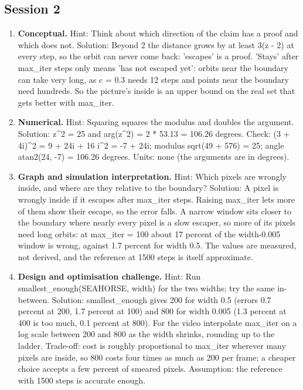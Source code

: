 \documentclass[11pt,a4paper]{article}
\begin{document}
\subsection*{Session 2}
\begin{enumerate}[nosep]
\item \textbf{Conceptual.} Hint: Think about which direction of the claim has a proof and which does not. Solution: Beyond 2 the distance grows by at least 3(\textbar{}z\textbar{} - 2) at every step, so the orbit can never come back: 'escapes' is a proof. 'Stays' after max\_iter steps only means 'has not escaped yet': orbits near the boundary can take very long, as c = 0.3 needs 12 steps and points near the boundary need hundreds. So the picture's inside is an upper bound on the real set that gets better with max\_iter.
\item \textbf{Numerical.} Hint: Squaring squares the modulus and doubles the argument. Solution: \textbar{}z\textasciicircum{}2\textbar{} = 25 and arg(z\textasciicircum{}2) = 2 * 53.13 = 106.26 degrees. Check: (3 + 4i)\textasciicircum{}2 = 9 + 24i + 16 i\textasciicircum{}2 = -7 + 24i; modulus sqrt(49 + 576) = 25; angle atan2(24, -7) = 106.26 degrees. Units: none (the arguments are in degrees).
\item \textbf{Graph and simulation interpretation.} Hint: Which pixels are wrongly inside, and where are they relative to the boundary? Solution: A pixel is wrongly inside if it escapes after max\_iter steps. Raising max\_iter lets more of them show their escape, so the error falls. A narrow window sits closer to the boundary where nearly every pixel is a slow escaper, so more of its pixels need long orbits: at max\_iter = 100 about 17 percent of the width-0.005 window is wrong, against 1.7 percent for width 0.5. The values are measured, not derived, and the reference at 1500 steps is itself approximate.
\item \textbf{Design and optimisation challenge.} Hint: Run smallest\_enough(SEAHORSE, width) for the two widths; try the same in-between. Solution: smallest\_enough gives 200 for width 0.5 (errors 0.7 percent at 200, 1.7 percent at 100) and 800 for width 0.005 (1.3 percent at 400 is too much, 0.1 percent at 800). For the video interpolate max\_iter on a log scale between 200 and 800 as the width shrinks, rounding up to the ladder. Trade-off: cost is roughly proportional to max\_iter wherever many pixels are inside, so 800 costs four times as much as 200 per frame; a cheaper choice accepts a few percent of smeared pixels. Assumption: the reference with 1500 steps is accurate enough.
\end{enumerate}
\end{document}

